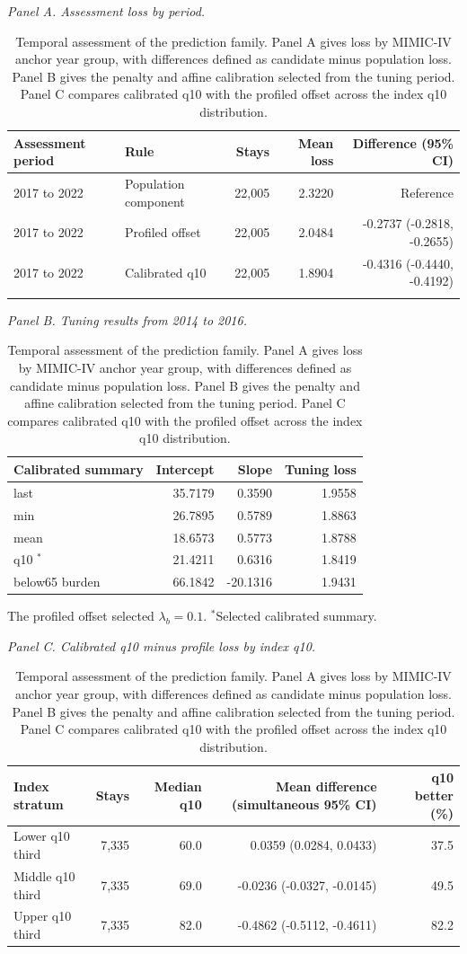 \begin{table}[!htbp]
\caption{Temporal assessment of the prediction family. Panel A gives loss by MIMIC-IV anchor year group, with differences defined as candidate minus population loss. Panel B gives the penalty and affine calibration selected from the tuning period. Panel C compares calibrated q10 with the profiled offset across the index q10 distribution.}
\label{tab:supp_temporal_validation}
\centering
\footnotesize
\textit{Panel A. Assessment loss by period.}\par\smallskip
\begin{tabular}{llrrr}
\toprule
Assessment period & Rule & Stays & Mean loss & Difference (95\% CI)\\
\midrule
2017 to 2022 & Population component & 22,005 & 2.3220 & Reference\\
2017 to 2022 & Profiled offset & 22,005 & 2.0484 & -0.2737 (-0.2818, -0.2655)\\
2017 to 2022 & Calibrated q10 & 22,005 & 1.8904 & -0.4316 (-0.4440, -0.4192)\\
\addlinespace
\bottomrule
\end{tabular}
\par\medskip
\textit{Panel B. Tuning results from 2014 to 2016.}\par\smallskip
\begin{tabular}{lrrr}
\toprule
Calibrated summary & Intercept & Slope & Tuning loss\\
\midrule
last & 35.7179 & 0.3590 & 1.9558\\
min & 26.7895 & 0.5789 & 1.8863\\
mean & 18.6573 & 0.5773 & 1.8788\\
q10 $^{*}$ & 21.4211 & 0.6316 & 1.8419\\
below65 burden & 66.1842 & -20.1316 & 1.9431\\
\bottomrule
\end{tabular}
\begin{flushleft}\footnotesize The profiled offset selected $\lambda_b=0.1$. $^{*}$Selected calibrated summary.\end{flushleft}
\par\medskip
\textit{Panel C. Calibrated q10 minus profile loss by index q10.}\par\smallskip
\begin{tabular}{lrrrr}
\toprule
Index stratum & Stays & Median q10 & Mean difference (simultaneous 95\% CI) & q10 better (\%)\\
\midrule
Lower q10 third & 7,335 & 60.0 & 0.0359 (0.0284, 0.0433) & 37.5\\
Middle q10 third & 7,335 & 69.0 & -0.0236 (-0.0327, -0.0145) & 49.5\\
Upper q10 third & 7,335 & 82.0 & -0.4862 (-0.5112, -0.4611) & 82.2\\
\bottomrule
\end{tabular}
\end{table}
